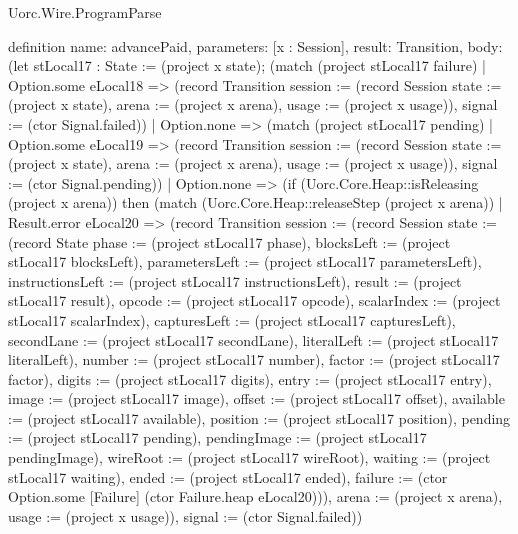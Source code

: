 \begin{lexlean}{Uorc.Wire.ProgramParse}
\begin{semanticmodule}
definition{
  name: advancePaid,
  parameters: [x : Session],
  result: Transition,
  body: (let stLocal17 : State := (project x state); (match (project stLocal17 failure)
    | Option.some eLocal18 => (record Transition {session := (record Session {state := (project x state), arena := (project x arena), usage := (project x usage)}), signal := (ctor Signal.failed)})
    | Option.none => (match (project stLocal17 pending)
      | Option.some eLocal19 => (record Transition {session := (record Session {state := (project x state), arena := (project x arena), usage := (project x usage)}), signal := (ctor Signal.pending)})
      | Option.none => (if (Uorc.Core.Heap::isReleasing (project x arena)) then (match (Uorc.Core.Heap::releaseStep (project x arena))
        | Result.error eLocal20 => (record Transition {session := (record Session {state := (record State {phase := (project stLocal17 phase), blocksLeft := (project stLocal17 blocksLeft), parametersLeft := (project stLocal17 parametersLeft), instructionsLeft := (project stLocal17 instructionsLeft), result := (project stLocal17 result), opcode := (project stLocal17 opcode), scalarIndex := (project stLocal17 scalarIndex), capturesLeft := (project stLocal17 capturesLeft), secondLane := (project stLocal17 secondLane), literalLeft := (project stLocal17 literalLeft), number := (project stLocal17 number), factor := (project stLocal17 factor), digits := (project stLocal17 digits), entry := (project stLocal17 entry), image := (project stLocal17 image), offset := (project stLocal17 offset), available := (project stLocal17 available), position := (project stLocal17 position), pending := (project stLocal17 pending), pendingImage := (project stLocal17 pendingImage), wireRoot := (project stLocal17 wireRoot), waiting := (project stLocal17 waiting), ended := (project stLocal17 ended), failure := (ctor Option.some [Failure] (ctor Failure.heap eLocal20))}), arena := (project x arena), usage := (project x usage)}), signal := (ctor Signal.failed)})
}
\end{semanticmodule}
\end{lexlean}
